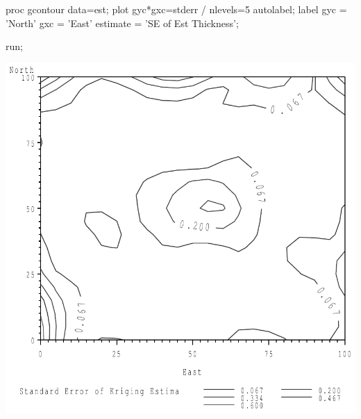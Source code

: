 \documentclass{article}
\begin{document}
\begin{Winput}
proc gcontour data=est;
    plot gyc*gxc=stderr / nlevels=5 autolabel;
  label gyc      = 'North' 
        gxc      = 'East' 
        estimate = 'SE of Est Thickness'; 


    
run;
\end{Winput}
\includegraphics[]{thick-5-SAS-fig.pdf}
\end{document}
